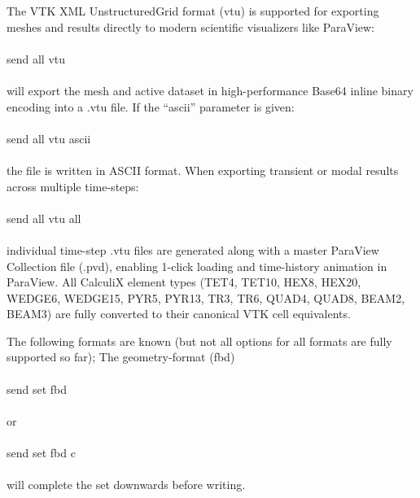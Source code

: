 \documentclass{article}
\begin{document}
The VTK XML UnstructuredGrid format (vtu) is supported for exporting meshes and results directly to modern scientific visualizers like ParaView:\\\\send all vtu\\\\will export the mesh and active dataset in high-performance Base64 inline binary encoding into a .vtu file. If the ``ascii'' parameter is given:\\\\send all vtu ascii\\\\the file is written in ASCII format. When exporting transient or modal results across multiple time-steps:\\\\send all vtu all\\\\individual time-step .vtu files are generated along with a master ParaView Collection file (.pvd), enabling 1-click loading and time-history animation in ParaView. All CalculiX element types (TET4, TET10, HEX8, HEX20, WEDGE6, WEDGE15, PYR5, PYR13, TR3, TR6, QUAD4, QUAD8, BEAM2, BEAM3) are fully converted to their canonical VTK cell equivalents.

The following formats are known (but not all options for all formats are fully supported so far); The geometry-format (fbd)\\\\send set fbd\\\\or\\\\send set fbd c\\\\will complete the set downwards before writing.
\end{document}
